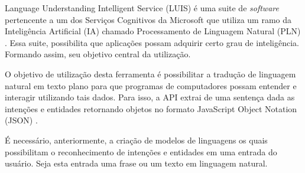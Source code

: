 Language Understanding Intelligent Service (LUIS) é uma suite de \textit{software} pertencente a um dos Serviços Cognitivos da Microsoft que utiliza um ramo da Inteligência Artificial (IA) chamado Processamento de Linguagem Natural (PLN) \cite{Mayo:2017}. Essa suite, possibilita que aplicações possam adquirir certo grau de inteligência. Formando assim, seu objetivo central da utilização.

O objetivo de utilização desta ferramenta é possibilitar a tradução de linguagem natural em texto plano para que programas de computadores possam entender e interagir utilizando tais dados. Para isso, a API extrai de uma sentença dada as intenções e entidades retornando objetos no formato JavaScript Object Notation (JSON) \cite{Mayo:2017}.

É necessário, anteriormente, a criação de modelos de linguagens os quais possibilitam o reconhecimento de intenções e entidades em uma entrada do usuário. Seja esta entrada uma frase ou um texto em linguagem natural.
